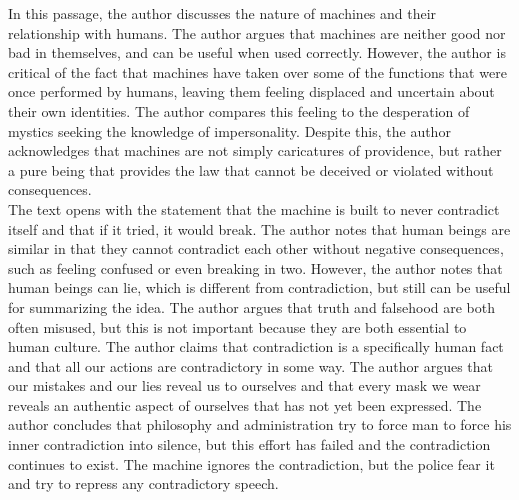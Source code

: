 \documentclass{homework}
\begin{document}
In this passage, the author discusses the nature of machines and their relationship
with humans. The author argues that machines are neither good nor bad in themselves, 
and can be useful when used correctly. However, the author is critical of the fact 
that machines have taken over some of the functions that were once performed by 
humans, leaving them feeling displaced and uncertain about their own identities. 
The author compares this feeling to the desperation of mystics seeking the 
knowledge of impersonality. Despite this, the author acknowledges that machines 
are not simply caricatures of providence, but rather a pure being that provides 
the law that cannot be deceived or violated without consequences. \\

The text opens with the statement that the machine is built to never contradict 
itself and that if it tried, it would break. The author notes that human beings 
are similar in that they cannot contradict each other without negative 
consequences, such as feeling confused or even breaking in two. However, 
the author notes that human beings can lie, which is different from 
contradiction, but still can be useful for summarizing the idea. 
The author argues that truth and falsehood are both often misused, 
but this is not important because they are both essential to human 
culture. The author claims that contradiction is a specifically 
human fact and that all our actions are contradictory in some way.
The author argues that our mistakes and our lies reveal us to 
ourselves and that every mask we wear reveals an authentic aspect 
of ourselves that has not yet been expressed. The author concludes 
that philosophy and administration try to force man to force his 
inner contradiction into silence, but this effort has failed and 
the contradiction continues to exist. The machine ignores the 
contradiction, but the police fear it and try to repress any 
contradictory speech.
\end{document}
